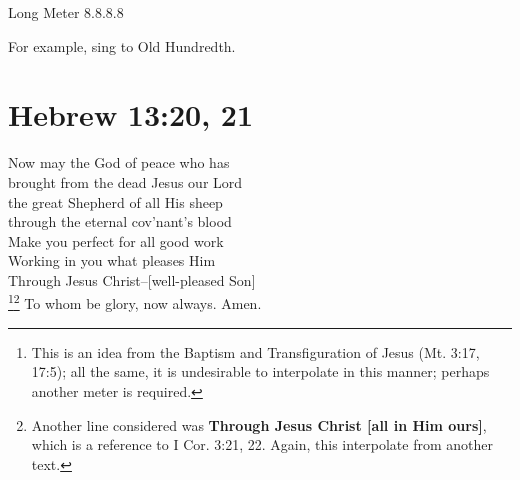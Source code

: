 \documentclass{article}
\begin{document}
\noindent Long Meter 8.8.8.8

\noindent For example, sing to Old Hundredth.

\section*{Hebrew 13:20, 21}

 Now may the God of peace who has\\
brought from the dead Jesus our Lord\\
the great Shepherd of all His sheep\\
through the eternal cov'nant's blood\\

 Make you perfect for all good work\\
Working in you what pleases Him\\
Through Jesus Christ--[well-pleased Son]\\\footnote{This is an idea from the Baptism and Transfiguration of Jesus (Mt. 3:17, 17:5); all the same, it is undesirable to interpolate in this manner; perhaps another meter is required.}\footnote{Another line considered was \textbf{Through Jesus Christ [all in Him ours]}, which is a reference to I Cor. 3:21, 22. Again, this interpolate from another text.}
To whom be glory, now always. Amen.
\end{document}
